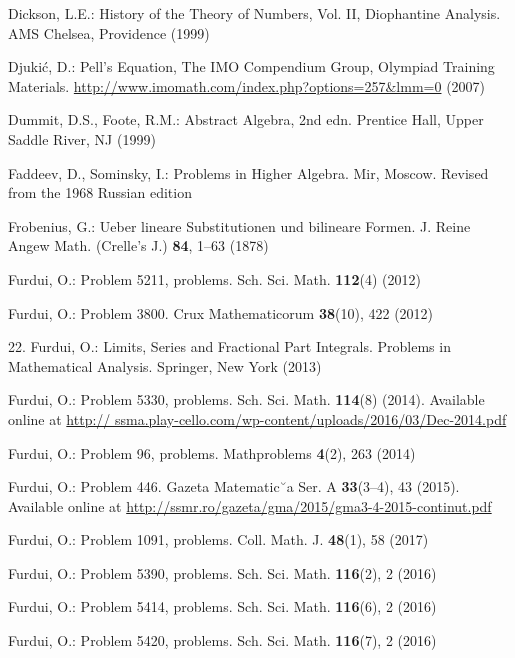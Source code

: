 \begin{thebibliography}{99}
  Dickson, L.E.: History of the Theory of Numbers, Vol. II, Diophantine Analysis. AMS Chelsea,
  Providence (1999)

  Djuki\'c, D.: Pell’s Equation, The IMO Compendium Group, Olympiad Training Materials.
  \href{http://www.imomath.com/index.php?options=257\&lmm=0}
  {http://www.imomath.com/index.php?options=257\&lmm=0} (2007)

  Dummit, D.S., Foote, R.M.: Abstract Algebra, 2nd edn. Prentice Hall, Upper Saddle River, NJ
  (1999)

  Faddeev, D., Sominsky, I.: Problems in Higher Algebra. Mir, Moscow. Revised from the 1968 Russian edition

  Frobenius, G.: Ueber lineare Substitutionen und bilineare Formen. J. Reine Angew Math.
  (Crelle’s J.) \textbf{84}, 1–63 (1878)

  Furdui, O.: Problem 5211, problems. Sch. Sci. Math. \textbf{112}(4) (2012)

  Furdui, O.: Problem 3800. Crux Mathematicorum \textbf{38}(10), 422 (2012)

  22. Furdui, O.: Limits, Series and Fractional Part Integrals. Problems in Mathematical Analysis.
  Springer, New York (2013)

  Furdui, O.: Problem 5330, problems. Sch. Sci. Math. \textbf{114}(8) (2014). Available online at \href{http://
  ssma.play-cello.com/wp-content/uploads/2016/03/Dec-2014.pdf}
  {http://
  ssma.play-cello.com/wp-content/uploads/2016/03/Dec-2014.pdf}

  Furdui, O.: Problem 96, problems. Mathproblems \textbf{4}(2), 263 (2014)

  Furdui, O.: Problem 446. Gazeta Matematic˘a Ser. A \textbf{33}(3–4), 43 (2015). Available online at
  \href{http://ssmr.ro/gazeta/gma/2015/gma3-4-2015-continut.pdf}
  {http://ssmr.ro/gazeta/gma/2015/gma3-4-2015-continut.pdf}

  Furdui, O.: Problem 1091, problems. Coll. Math. J. \textbf{48}(1), 58 (2017)

  Furdui, O.: Problem 5390, problems. Sch. Sci. Math. \textbf{116}(2), 2 (2016)

  Furdui, O.: Problem 5414, problems. Sch. Sci. Math. \textbf{116}(6), 2 (2016)

  Furdui, O.: Problem 5420, problems. Sch. Sci. Math. \textbf{116}(7), 2 (2016)


\end{thebibliography}
